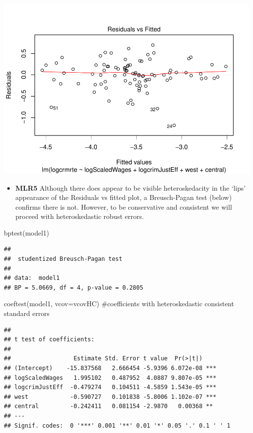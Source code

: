 \documentclass[]{article}
\newenvironment{Shaded}{}{}
\newcommand{\CommentTok}[1]{\textcolor[rgb]{0.00,0.50,0.00}{#1}}
\newcommand{\DataTypeTok}[1]{#1}
\newcommand{\KeywordTok}[1]{\textcolor[rgb]{0.00,0.00,1.00}{#1}}
\newcommand{\NormalTok}[1]{#1}
\providecommand{\tightlist}{%
  \setlength{\itemsep}{0pt}\setlength{\parskip}{0pt}}
\begin{document}
\includegraphics{Bagnard_Gaustad_Hartman_Leung_Lab_3_files/figure-latex/unnamed-chunk-61-1.pdf}

\begin{itemize}
\tightlist
\item
  \textbf{MLR5} Although there does appear to be visible heteroskedacity
  in the `lips' appearance of the Residuals vs fitted plot, a
  Breusch-Pagan test (below) confirms there is not. However, to be
  conservative and consistent we will proceed with heteroskedastic
  robust errors.
\end{itemize}

\begin{Shaded}
\begin{Highlighting}[]
\KeywordTok{bptest}\NormalTok{(model1)}
\end{Highlighting}
\end{Shaded}

\begin{verbatim}
## 
##  studentized Breusch-Pagan test
## 
## data:  model1
## BP = 5.0669, df = 4, p-value = 0.2805
\end{verbatim}

\begin{Shaded}
\begin{Highlighting}[]
\KeywordTok{coeftest}\NormalTok{(model1, }\DataTypeTok{vcov=}\NormalTok{vcovHC) }\CommentTok{#coefficients with heteroskedastic consistent standard errors}
\end{Highlighting}
\end{Shaded}

\begin{verbatim}
## 
## t test of coefficients:
## 
##                  Estimate Std. Error t value  Pr(>|t|)    
## (Intercept)    -15.837568   2.666454 -5.9396 6.072e-08 ***
## logScaledWages   1.995102   0.487952  4.0887 9.807e-05 ***
## logcrimJustEff  -0.479274   0.104511 -4.5859 1.543e-05 ***
## west            -0.590727   0.101838 -5.8006 1.102e-07 ***
## central         -0.242411   0.081154 -2.9870   0.00368 ** 
## ---
## Signif. codes:  0 '***' 0.001 '**' 0.01 '*' 0.05 '.' 0.1 ' ' 1
\end{verbatim}
\end{document}
